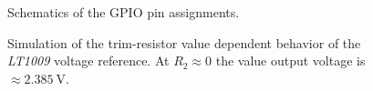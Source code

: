     \newpage
    \begin{figure}[ht]
        \centering
        
        \caption[Schematics of the GPIO pin assignments]{Schematics of the GPIO pin assignments.}%
        \label{fig:schematics of raspberry gpio configuration}
    \end{figure}
    \newpage
    \begin{figure}[ht]
        \centering
        
        \caption[Simulation of the trim-resistor value dependent behavior of the \textit{LT1009} voltage reference]{Simulation of the trim-resistor value dependent behavior of the \textit{LT1009} voltage reference. At \(R_2 \approx 0\) the value output voltage is \(\approx \qty{2.385}{\volt}\).}%
        \label{fig:LT1009 sim}
    \end{figure}
    \newpage

